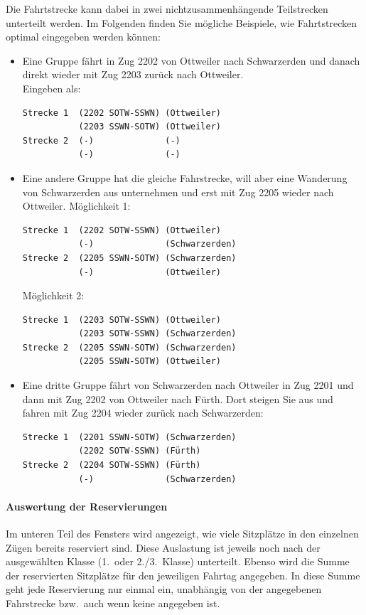 Die Fahrtstrecke kann dabei in zwei nichtzusammenhängende Teilstrecken unterteilt werden.
Im Folgenden finden Sie mögliche Beispiele, wie Fahrtstrecken optimal eingegeben werden können:
\begin{itemize}
	\item Eine Gruppe fährt in Zug 2202 von Ottweiler nach Schwarzerden und danach direkt wieder mit Zug 2203 zurück nach Ottweiler.\\
	Eingeben als:
	\begin{verbatim}Strecke 1  (2202 SOTW-SSWN) (Ottweiler)
           (2203 SSWN-SOTW) (Ottweiler)
Strecke 2  (-)              (-)
           (-)              (-)
	\end{verbatim}
	\item
	Eine andere Gruppe hat die gleiche Fahrstrecke, will aber eine Wanderung von Schwarzerden aus unternehmen und erst mit Zug 2205 wieder nach Ottweiler.
	Möglichkeit 1:
	\begin{verbatim}Strecke 1  (2202 SOTW-SSWN) (Ottweiler)
           (-)              (Schwarzerden)
Strecke 2  (2205 SSWN-SOTW) (Schwarzerden)
           (-)              (Ottweiler)
	\end{verbatim}
	Möglichkeit 2:
	\begin{verbatim}Strecke 1  (2203 SOTW-SSWN) (Ottweiler)
           (2203 SOTW-SSWN) (Schwarzerden)
Strecke 2  (2205 SSWN-SOTW) (Schwarzerden)
           (2205 SSWN-SOTW) (Ottweiler)
	\end{verbatim}
	\item
	Eine dritte Gruppe fährt von Schwarzerden nach Ottweiler in Zug 2201 und dann mit Zug 2202 von Ottweiler nach Fürth.
	Dort steigen Sie aus und fahren mit Zug 2204 wieder zurück nach Schwarzerden:
	\begin{verbatim}
Strecke 1  (2201 SSWN-SOTW) (Schwarzerden)
           (2202 SOTW-SSWN) (Fürth)
Strecke 2  (2204 SOTW-SSWN) (Fürth)
           (-)              (Schwarzerden)
	\end{verbatim}
\end{itemize}


\paragraph{Auswertung der Reservierungen}
Im unteren Teil des Fensters wird angezeigt,
wie viele Sitzplätze in den einzelnen Zügen bereits reserviert sind.
Diese Auslastung ist jeweils noch nach der ausgewählten Klasse (1.\ oder 2./3.~Klasse) unterteilt.
Ebenso wird die Summe der reservierten Sitzplätze für den jeweiligen Fahrtag angegeben.
In diese Summe geht jede Reservierung nur einmal ein, unabhängig von der angegebenen Fahrstrecke bzw.\ auch wenn keine angegeben ist.


